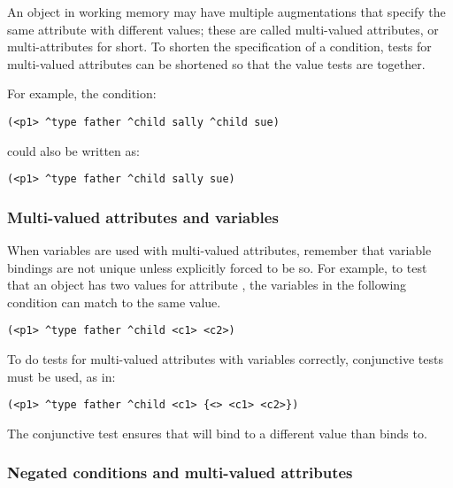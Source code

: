 An object in working memory may have multiple augmentations that specify the same attribute with different values; these are called multi-valued attributes, or multi-attributes for short.  To shorten the specification of a condition, tests for multi-valued attributes can be shortened so that the value tests are together.

For example, the condition:

\begin{verbatim}
(<p1> ^type father ^child sally ^child sue)
\end{verbatim}

could also be written as:

\begin{verbatim}
(<p1> ^type father ^child sally sue)
\end{verbatim}


\subsubsection*{Multi-valued attributes and variables}

When variables are used with multi-valued attributes, remember that variable bindings are not unique unless explicitly forced to be so. For example, to test that an object has two values for attribute , the variables in the following condition can match to the same value.

\begin{verbatim}
(<p1> ^type father ^child <c1> <c2>)
\end{verbatim} 
\vspace{12pt}

To do tests for multi-valued attributes with variables correctly, conjunctive tests must be used, as in:

\begin{verbatim}
(<p1> ^type father ^child <c1> {<> <c1> <c2>})
\end{verbatim} 

The conjunctive test  ensures that  will bind to a different value than  binds to.


\subsubsection*{Negated conditions and multi-valued attributes}

